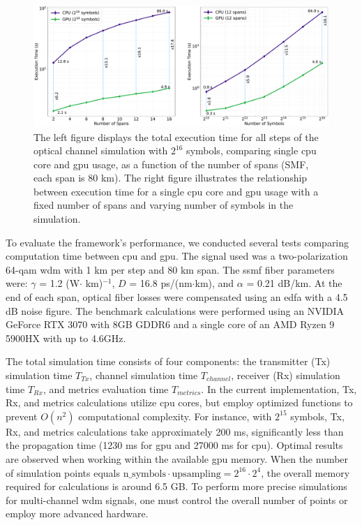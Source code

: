 \begin{figure}[t]
   \centering
    \includegraphics[width=1\linewidth]{images/hpcom/total.pdf}
    \caption{The left figure displays the total execution time for all steps of the optical channel simulation with $2^{16}$ symbols, comparing single \acrshort{cpu} core and \acrshort{gpu} usage, as a function of the number of spans (SMF, each span is 80 km). The right figure illustrates the relationship between execution time for a single \acrshort{cpu} core and \acrshort{gpu} usage with a fixed number of spans and varying number of symbols in the simulation.}
    \label{fig:total}
\end{figure}

To evaluate the framework's performance, we conducted several tests comparing computation time between \acrshort{cpu} and \acrshort{gpu}. The signal used was a two-polarization 64-\acrshort{qam} \acrshort{wdm} with 1 km per step and 80 km span. The \acrshort{ssmf} fiber parameters were: $\gamma$ = 1.2 (W$\cdot$ km)$^{-1}$, $D$ = 16.8 ps/(nm$\cdot$km), and $\alpha$ = 0.21 dB/km. At the end of each span, optical fiber losses were compensated using an \acrshort{edfa} with a 4.5 dB noise figure. The benchmark calculations were performed using an NVIDIA GeForce RTX 3070 with 8GB GDDR6 and a single core of an AMD Ryzen 9 5900HX with up to 4.6GHz.

The total simulation time consists of four components: the transmitter (Tx) simulation time $T_{Tx}$, channel simulation time $T_{channel}$, receiver (Rx) simulation time $T_{Rx}$, and metrics evaluation time $T_{metrics}$. In the current implementation, Tx, Rx, and metrics calculations utilize \acrshort{cpu} cores, but employ optimized functions to prevent $O(n^2)$ computational complexity. For instance, with $2^{15}$ symbols, Tx, Rx, and metrics calculations take approximately 200 ms, significantly less than the propagation time (1230 ms for \acrshort{gpu} and 27000 ms for \acrshort{cpu}). Optimal results are observed when working within the available \acrshort{gpu} memory. When the number of simulation points equals $\mathrm{n\_symbols} \cdot \mathrm{upsampling} = 2^{16} \cdot 2^{4}$, the overall memory required for calculations is around 6.5 GB. To perform more precise simulations for multi-channel \acrshort{wdm} signals, one must control the overall number of points or employ more advanced hardware.

